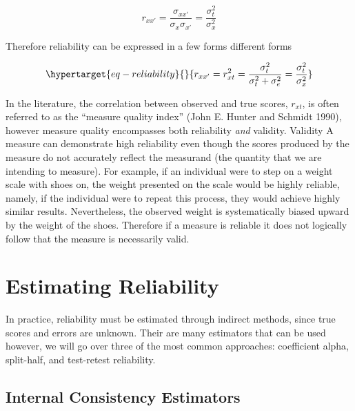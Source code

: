 \documentclass[
  letterpaper,
  DIV=11,
  numbers=noendperiod]{scrreprt}
\begin{document}
\[r_{xx'}=\frac{\sigma_{xx'}}{\sigma_x\sigma_{x'}}  = \frac{\sigma_t^2}{\sigma^2_{x}}\]

Therefore reliability can be expressed in a few forms different forms

\begin{equation}\protect\hypertarget{eq-reliability}{}{
r_{xx'} =r^2_{xt} = \frac{\sigma_t^2}{\sigma_t^2+\sigma_{e}^2} = \frac{\sigma_t^2}{\sigma_{x}^2}
}\label{eq-reliability}\end{equation}

In the literature, the correlation between observed and true scores,
\(r_{xt}\), is often referred to as the ``measure quality index'' (John
E. Hunter and Schmidt 1990), however measure quality encompasses both
reliability \emph{and} validity. Validity A measure can demonstrate high
reliability even though the scores produced by the measure do not
accurately reflect the measurand (the quantity that we are intending to
measure). For example, if an individual were to step on a weight scale
with shoes on, the weight presented on the scale would be highly
reliable, namely, if the individual were to repeat this process, they
would achieve highly similar results. Nevertheless, the observed weight
is systematically biased upward by the weight of the shoes. Therefore if
a measure is reliable it does not logically follow that the measure is
necessarily valid.

\hypertarget{estimating-reliability}{%
\section{Estimating Reliability}\label{estimating-reliability}}

In practice, reliability must be estimated through indirect methods,
since true scores and errors are unknown. Their are many estimators that
can be used however, we will go over three of the most common
approaches: coefficient alpha, split-half, and test-retest reliability.

\hypertarget{internal-consistency-estimators}{%
\subsection*{Internal Consistency
Estimators}\label{internal-consistency-estimators}}
\end{document}
